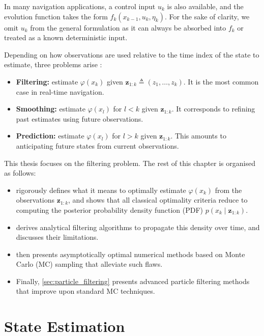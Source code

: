 \begin{remark}
	In many navigation applications, a control input $u_k$ is also available, and the evolution function takes the form $f_k(x_{k-1}, u_k, \eta_k)$. For the sake of clarity, we omit $u_k$ from the general formulation as it can always be absorbed into $f_k$ or treated as a known deterministic input.
\end{remark}

Depending on how observations are used relative to the time index of the state to estimate, three problems arise \cite{bib:nonlinear-smoothing}:
\begin{itemize}
	\item \textbf{Filtering:} estimate $\varphi(x_k)$ given $\mathbf{z}_{1:k}\triangleq(z_1,\dots,z_k)$. It is the most common case in real-time navigation.
	\item \textbf{Smoothing:} estimate $\varphi(x_l)$ for $l < k$ given $\mathbf{z}_{1:k}$. It corresponds to refining past estimates using future observations.
	\item \textbf{Prediction:} estimate $\varphi(x_l)$ for $l > k$ given $\mathbf{z}_{1:k}$. This amounts to anticipating future states from current observations.
\end{itemize}

This thesis focuses on the filtering problem. The rest of this chapter is organised as follows:
\begin{itemize}
	\item{} rigorously defines what it means to optimally estimate $\varphi(x_k)$ from the observations $\mathbf{z}_{1:k}$, and shows that all classical optimality criteria reduce to computing the posterior probability density function (PDF) $p(x_k\mid\mathbf{z}_{1:k})$.
	\item{} derives analytical filtering algorithms to propagate this density over time, and discusses their limitations.
	\item{} then presents asymptotically optimal numerical methods based on Monte Carlo (MC) sampling that alleviate such flaws.
	\item Finally, \cref{sec:particle_filtering} presents advanced particle filtering methods that improve upon standard MC techniques.
\end{itemize}

\section{State Estimation}\label{sec:state_estimation}

